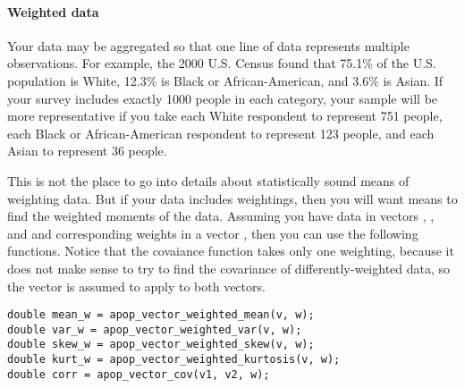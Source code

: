 \paragraph{\treesymbol{} Weighted data} Your data may be aggregated so
that one line of data represents multiple observations. For example, the
2000 U.S. Census found that 75.1\% of the U.S. population is White,
12.3\% is Black or African-American, and 3.6\% is Asian. If your survey
includes exactly 1000 people in each category, your sample will be more
representative if you take each White respondent to represent 751
people, each Black or African-American respondent to represent 123
people, and each Asian to represent 36 people. 

This is not the place to go into details about statistically sound means
of weighting data. But if your data includes weightings, then you will
want means to find the weighted moments of the data. Assuming you have
data in vectors , , and  and corresponding weights in a vector
, then you can use the following functions. Notice that the
covaiance function takes only one weighting, because it does not make
sense to try to find the covariance of differently-weighted data, so the
 vector is assumed to apply to both vectors.
 
 
\begin{lstlisting}
double mean_w = apop_vector_weighted_mean(v, w);
double var_w = apop_vector_weighted_var(v, w);
double skew_w = apop_vector_weighted_skew(v, w);
double kurt_w = apop_vector_weighted_kurtosis(v, w);
double corr = apop_vector_cov(v1, v2, w);
\end{lstlisting}


